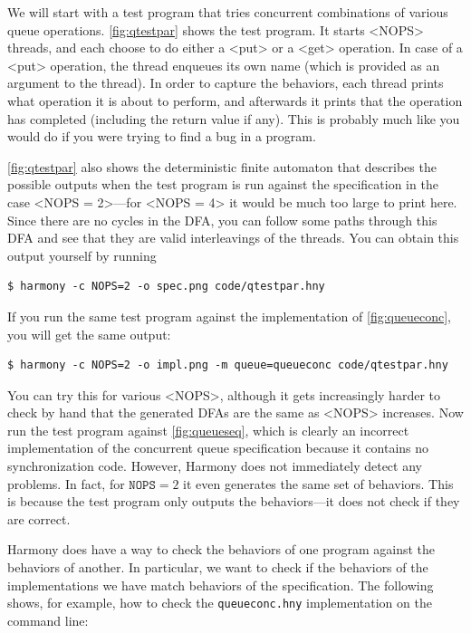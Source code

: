 \documentclass{report}
\newenvironment{code}{
\tcolorbox
}{
\endtcolorbox
}
\begin{document}
We will start with a test program that tries concurrent combinations
of various queue operations.
\autoref{fig:qtestpar} shows the test program.  It starts
<{NOPS}> threads, and each choose to do either a <{put}>
or a <{get}> operation.  In case of a <{put}> operation,
the thread enqueues its own name (which is provided as an argument
to the thread).  In order to capture the behaviors,
each thread prints what operation it is about to perform,
and afterwards it prints that the operation has
completed (including the return value if any).
This is probably much like you would do if you were trying to find a
bug in a program.

\autoref{fig:qtestpar} also shows the deterministic finite automaton
that describes the possible outputs when the test
program is run against the specification in the case
<{NOPS = 2}>---for <{NOPS = 4}> it would be much
too large to print here.  Since there are no cycles in the DFA, you
can follow some paths through this DFA and see that they are valid
interleavings of the threads.
You can obtain this output yourself by running

\begin{code}
\begin{verbatim}
$ harmony -c NOPS=2 -o spec.png code/qtestpar.hny
\end{verbatim}
\end{code}

If you run the same test program against the implementation
of \autoref{fig:queueconc}, you will get the same output:

\begin{code}
\begin{verbatim}
$ harmony -c NOPS=2 -o impl.png -m queue=queueconc code/qtestpar.hny
\end{verbatim}
\end{code}

You can
try this for various <{NOPS}>, although it gets increasingly
harder to check by hand that the generated DFAs are the same as
<{NOPS}> increases.
Now run the test program against \autoref{fig:queueseq}, which is
clearly an incorrect implementation of the concurrent queue specification
because it contains no synchronization code.
However, Harmony does not immediately detect
any problems.  In fact, for $\mathtt{NOPS} = 2$ it even generates
the same set of behaviors.
This is because the test program only outputs the behaviors---it does
not check if they are correct.

Harmony does have a way to check the behaviors of one program against
the behaviors of another.  In particular, we want to check if the
behaviors of the implementations we have match behaviors of the
specification.  The following shows, for example, how to check the
\texttt{queueconc.hny} implementation on the command line:
\end{document}
